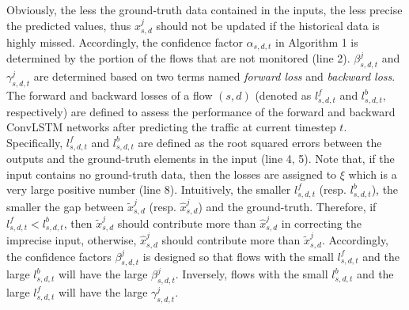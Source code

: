 Obviously, the less the ground-truth data contained in the inputs, the less precise the predicted values, thus $x_{s,d}^j$ should not be updated if the historical data is highly missed. Accordingly, the confidence factor $\alpha_{s,d,t}$ in Algorithm 1 is determined by the portion of the flows that are not monitored (line 2).  
$\beta^j_{s,d,t}$ and $\gamma^j_{s,d,t}$ are determined based on two terms named \textit{forward loss} and \textit{backward loss}.
The forward and backward losses of a flow $(s,d)$ (denoted as $l_{s,d,t}^f$ and $l_{s,d,t}^b$, respectively) are defined to assess the performance of the forward and backward ConvLSTM networks after predicting the traffic at current timestep $t$. Specifically, $l_{s,d,t}^f$ and $l_{s,d,t}^b$ are defined as the root squared errors between the outputs and the ground-truth elements in the input (line 4, 5). Note that, if the input contains no ground-truth data, then the losses are assigned to $\xi$ which is a very large positive number (line 8).
Intuitively, the smaller $l_{s,d,t}^f$ (resp. $l_{s,d,t}^b$), the smaller the gap between $\widetilde{x}_{s,d}^j$ (resp. $\widehat{x}_{s,d}^j$) and the ground-truth. Therefore, if $l_{s,d,t}^f < l_{s,d,t}^b$, then $\widetilde{x}_{s,d}^j$ should contribute more than $\widehat{x}_{s,d}^j$ in correcting the imprecise input, otherwise, $\widehat{x}_{s,d}^j$ should contribute more than $\widetilde{x}_{s,d}^j$.
Accordingly, the confidence factors $\beta^j_{s,d,t}$ is designed so that flows with the small $l_{s,d,t}^f$ and the large $l_{s,d,t}^b$ will have the large $\beta^j_{s,d,t}$. 
Inversely, flows with the small $l_{s,d,t}^b$ and the large $l_{s,d,t}^f$ will have the large $\gamma^j_{s,d,t}$.
